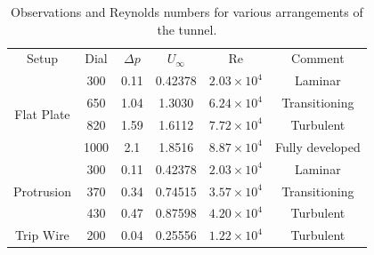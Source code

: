 \documentclass{article}
\begin{document}
\begin{table}[h]
    \centering
    \begin{tabular}{cccccc}
        \hline
        \multirow{2}{*}{Setup} & \multirow{2}{*}{Dial} & \multirow{2}{*}{$\Delta p$} & \multirow{2}{*}{$U_{\infty}$} & \multirow{2}{*}{Re} & \multirow{2}{*}{Comment} \\
        & & & & & \\
        \hline
        \hline
        \multirow{4}{*}{Flat Plate} & 300 & 0.11 & 0.42378 & $2.03 \times 10^4$ & Laminar \\
        & 650 & 1.04 & 1.3030 & $6.24 \times 10^4$ & Transitioning \\
        & 820 & 1.59 & 1.6112 & $7.72 \times 10^4$ & Turbulent \\
        & 1000 & 2.1 & 1.8516 & $8.87 \times 10^4$ & Fully developed \\
        \hline
        \hline
        \multirow{3}{*}{Protrusion} & 300 & 0.11 & 0.42378 & $2.03 \times 10^4$ & Laminar \\
        & 370 & 0.34 & 0.74515 & $3.57 \times 10^4$ & Transitioning \\
        & 430 & 0.47 & 0.87598 & $4.20 \times 10^4$ & Turbulent \\
        \hline
        \hline
        \multirow{1}{*}{Trip Wire} & 200 & 0.04 & 0.25556 & $1.22 \times 10^4$ & Turbulent \\
        \hline
    \end{tabular}
    \caption{Observations and Reynolds numbers for various arrangements of the tunnel.}
    \label{tab:observations}
\end{table}
\end{document}
